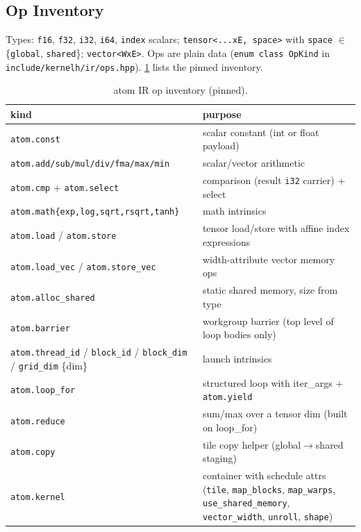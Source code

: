 \documentclass[10pt,twoside]{article}
\begin{document}
\subsection{Op Inventory}
\label{sec:ops}

Types: \texttt{f16}, \texttt{f32}, \texttt{i32}, \texttt{i64}, \texttt{index} scalars;
\texttt{tensor<...xE, space>} with \texttt{space} $\in$ \{\texttt{global}, \texttt{shared}\};
\texttt{vector<WxE>}. Ops are plain data (\texttt{enum class OpKind} in
\texttt{include/kernelh/ir/ops.hpp}). \cref{tab:ops} lists the pinned inventory.

\begin{table}[H]
\centering
\caption{atom IR op inventory (pinned).}
\label{tab:ops}
\footnotesize
\begin{tabularx}{\textwidth}{@{}>{\raggedright\arraybackslash}p{}
                              >{\raggedright\arraybackslash}X@{}}
\toprule
kind & purpose \\
\midrule
\texttt{atom.const} & scalar constant (int or float payload) \\
\texttt{atom.add/sub/mul/div/fma/max/min} & scalar/vector arithmetic \\
\texttt{atom.cmp} + \texttt{atom.select} & comparison (result \texttt{i32} carrier) + select \\
\texttt{atom.math\{exp,log,sqrt,rsqrt,tanh\}} & math intrinsics \\
\texttt{atom.load} / \texttt{atom.store} & tensor load/store with affine index expressions \\
\texttt{atom.load\_vec} / \texttt{atom.store\_vec} & width-attribute vector memory ops \\
\texttt{atom.alloc\_shared} & static shared memory, size from type \\
\texttt{atom.barrier} & workgroup barrier (top level of loop bodies only) \\
\texttt{atom.thread\_id} / \texttt{block\_id} / \texttt{block\_dim} / \texttt{grid\_dim} \{dim\} & launch intrinsics \\
\texttt{atom.loop\_for} & structured loop with iter\_args + \texttt{atom.yield} \\
\texttt{atom.reduce} & sum/max over a tensor dim (built on loop\_for) \\
\texttt{atom.copy} & tile copy helper (global$\to$shared staging) \\
\texttt{atom.kernel} & container with schedule attrs (\texttt{tile}, \texttt{map\_blocks},
\texttt{map\_warps}, \texttt{use\_shared\_memory}, \texttt{vector\_width}, \texttt{unroll}, \texttt{shape}) \\
\bottomrule
\end{tabularx}
\end{table}
\end{document}
